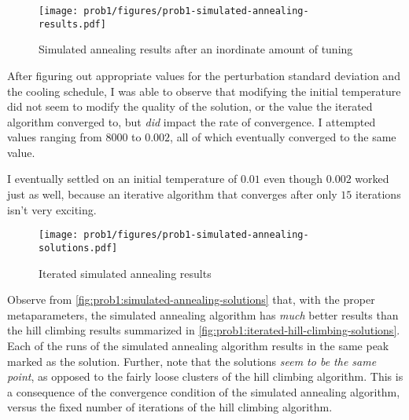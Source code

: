 \documentclass{article}
\begin{document}
\begin{figure}[H]
    \centering
    \texttt{[image: prob1/figures/prob1-simulated-annealing-results.pdf]}
    \caption{Simulated annealing results after an inordinate amount of
        tuning}\label{fig:prob1:simulated-annealing-results}
\end{figure}

After figuring out appropriate values for the perturbation standard deviation and the cooling
schedule, I was able to observe that modifying the initial temperature did not seem to modify the
quality of the solution, or the value the iterated algorithm converged to, but \textit{did} impact
the rate of convergence. I attempted values ranging from $8000$ to $0.002$, all of which eventually
converged to the same value.

I eventually settled on an initial temperature of $0.01$ even though $0.002$ worked just as well,
because an iterative algorithm that converges after only $15$ iterations isn't very exciting.


\begin{figure}[h]
    \centering
    \texttt{[image: prob1/figures/prob1-simulated-annealing-solutions.pdf]}
    \caption{Iterated simulated annealing results}\label{fig:prob1:simulated-annealing-solutions}
\end{figure}

Observe from \autoref{fig:prob1:simulated-annealing-solutions} that, with the proper
metaparameters, the simulated annealing algorithm has \textit{much} better results than the hill
climbing results summarized in \autoref{fig:prob1:iterated-hill-climbing-solutions}. Each of the
runs of the simulated annealing algorithm results in the same peak marked as the solution. Further,
note that the solutions \textit{seem to be the same point}, as opposed to the fairly loose clusters
of the hill climbing algorithm. This is a consequence of the convergence condition of the simulated
annealing algorithm, versus the fixed number of iterations of the hill climbing algorithm.
\end{document}

